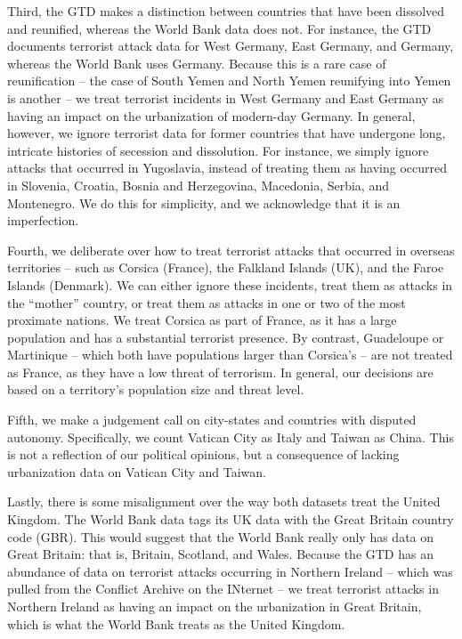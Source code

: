 \documentclass[preprint,2p,12pt]{elsarticle}
\begin{document}
Third, the GTD makes a distinction between countries that have been dissolved and reunified, whereas the World Bank data does not.
For instance, the GTD documents terrorist attack data for West Germany, East Germany, and Germany, whereas the World Bank uses Germany.
Because this is a rare case of reunification -- the case of South Yemen and North Yemen reunifying into Yemen is another -- we treat terrorist incidents in West Germany and East Germany as having an impact on the urbanization of modern-day Germany.
In general, however, we ignore terrorist data for former countries that have undergone long, intricate histories of secession and dissolution.
For instance, we simply ignore attacks that occurred in Yugoslavia, instead of treating them as having occurred in Slovenia, Croatia, Bosnia and Herzegovina, Macedonia, Serbia, and Montenegro.
We do this for simplicity, and we acknowledge that it is an imperfection.

Fourth, we deliberate over how to treat terrorist attacks that occurred in overseas territories -- such as Corsica (France), the Falkland Islands (UK), and the Faroe Islands (Denmark).
We can either ignore these incidents, treat them as attacks in the ``mother'' country, or treat them as attacks in one or two of the most proximate nations.
We treat Corsica as part of France, as it has a large population and has a substantial terrorist presence.
By contrast, Guadeloupe or Martinique -- which both have populations larger than Corsica's -- are not treated as France, as they have a low threat of terrorism.
In general, our decisions are based on a territory's population size and threat level.

Fifth, we make a judgement call on city-states and countries with disputed autonomy.
Specifically, we count Vatican City as Italy and Taiwan as China.
This is not a reflection of our political opinions, but a consequence of lacking urbanization data on Vatican City and Taiwan.

Lastly, there is some misalignment over the way both datasets treat the United Kingdom.
The World Bank data tags its UK data with the Great Britain country code (GBR).
This would suggest that the World Bank really only has data on Great Britain: that is, Britain, Scotland, and Wales.
Because the GTD has an abundance of data on terrorist attacks occurring in Northern Ireland -- which was pulled from the Conflict Archive on the INternet -- we treat terrorist attacks in Northern Ireland as having an impact on the urbanization in Great Britain, which is what the World Bank treats as the United Kingdom.
\end{document}
